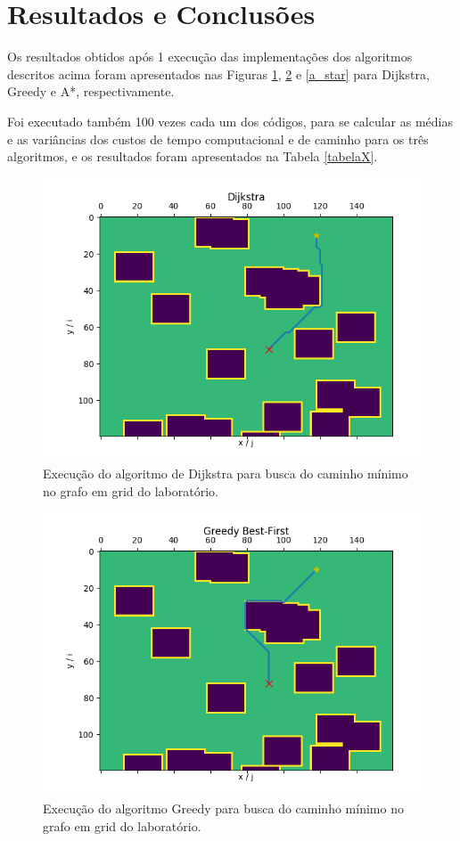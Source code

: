 \documentclass[conference]{IEEEtran}
\begin{document}
\section{Resultados e Conclusões}
Os resultados obtidos após 1 execução das implementações dos algoritmos descritos acima foram apresentados nas Figuras \ref{dijkstra}, \ref{greedy} e \ref{a_star} para Dijkstra, Greedy e A*, respectivamente.

Foi executado também 100 vezes cada um dos códigos, para se calcular as médias e as variâncias dos custos de tempo computacional e de caminho para os três algoritmos, e os resultados foram apresentados na Tabela \ref{tabelaX}.

\begin{figure}[htbp]
\centerline{\includegraphics[scale=0.4]{dijkstra_0.png}}
\caption{Execução do algoritmo de Dijkstra para busca do caminho mínimo no grafo em grid do laboratório.}
\label{dijkstra}
\end{figure}

\begin{figure}[htbp]
\centerline{\includegraphics[scale=0.4]{greedy_0.png}}
\caption{Execução do algoritmo Greedy para busca do caminho mínimo no grafo em grid do laboratório.}
\label{greedy}
\end{figure} 
\end{document}
